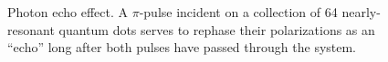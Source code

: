 \documentclass[conference]{IEEEtran}
\begin{document}
\begin{figure}
  \centering
  
  \caption{\label{fig:echo} Photon echo effect.
    A $\pi$-pulse incident on a collection of 64 nearly-resonant quantum dots serves to rephase their polarizations as an ``echo'' long after both pulses have passed through the system.
  }
\end{figure}


{}

\end{document}
